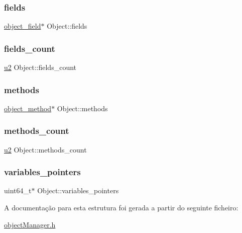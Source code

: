 \subsubsection{\texorpdfstring{fields}{fields}}
{\footnotesize\ttfamily \hyperlink{structobject__field}{object\+\_\+field}$\ast$ Object\+::fields}

\mbox{\label{struct_object_ae49188b2c3ab5fedd541cbca086e8838}} 
\subsubsection{\texorpdfstring{fields\+\_\+count}{fields\_count}}
{\footnotesize\ttfamily \hyperlink{util_8h_a55ef8d87fd202b8417704c089899c5b9}{u2} Object\+::fields\+\_\+count}

\mbox{\label{struct_object_a6c4dcef68e549e6dbcb579f141abd781}} 
\subsubsection{\texorpdfstring{methods}{methods}}
{\footnotesize\ttfamily \hyperlink{structobject__method}{object\+\_\+method}$\ast$ Object\+::methods}

\mbox{\label{struct_object_a78202b9e7c0aed0bd10e1bb750a7e15a}} 
\subsubsection{\texorpdfstring{methods\+\_\+count}{methods\_count}}
{\footnotesize\ttfamily \hyperlink{util_8h_a55ef8d87fd202b8417704c089899c5b9}{u2} Object\+::methods\+\_\+count}

\mbox{\label{struct_object_a9ea1c3bc8e1735168f9b9175931420e3}} 
\subsubsection{\texorpdfstring{variables\+\_\+pointers}{variables\_pointers}}
{\footnotesize\ttfamily uint64\+\_\+t$\ast$ Object\+::variables\+\_\+pointers}



A documentação para esta estrutura foi gerada a partir do seguinte ficheiro\+:\begin{DoxyCompactItemize}
\item 
\hyperlink{object_manager_8h}{object\+Manager.\+h}\end{DoxyCompactItemize}
